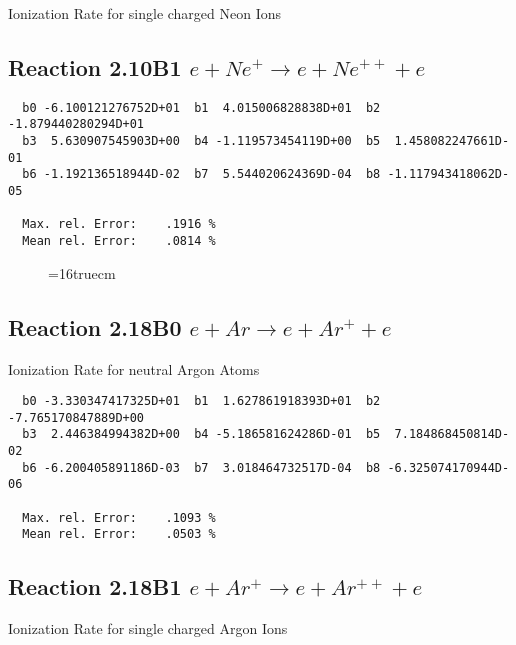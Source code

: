 \documentclass[12pt,dvipdfmx]{article}
\begin{document}
 Ionization Rate for single charged Neon Ions

\subsection{
Reaction 2.10B1  $ e + Ne^+ \rightarrow e + Ne^{++} + e $
}

\begin{small}\begin{verbatim}
  b0 -6.100121276752D+01  b1  4.015006828838D+01  b2 -1.879440280294D+01
  b3  5.630907545903D+00  b4 -1.119573454119D+00  b5  1.458082247661D-01
  b6 -1.192136518944D-02  b7  5.544020624369D-04  b8 -1.117943418062D-05

  Max. rel. Error:    .1916 %
  Mean rel. Error:    .0814 %

\end{verbatim}\end{small}


\begin{figure} \label{2.10B0}
\epsfxsize=16truecm
\end{figure}

\newpage

\subsection{
Reaction 2.18B0   $e + Ar  \rightarrow e + Ar^+  + e$
}

  Ionization Rate for neutral Argon Atoms

\begin{small}\begin{verbatim}
  b0 -3.330347417325D+01  b1  1.627861918393D+01  b2 -7.765170847889D+00
  b3  2.446384994382D+00  b4 -5.186581624286D-01  b5  7.184868450814D-02
  b6 -6.200405891186D-03  b7  3.018464732517D-04  b8 -6.325074170944D-06

  Max. rel. Error:    .1093 %
  Mean rel. Error:    .0503 %

\end{verbatim}\end{small}



\subsection{
Reaction 2.18B1   $e + Ar^+ \rightarrow e + Ar^{++} + e$
}

  Ionization Rate for single charged Argon Ions
\end{document}
